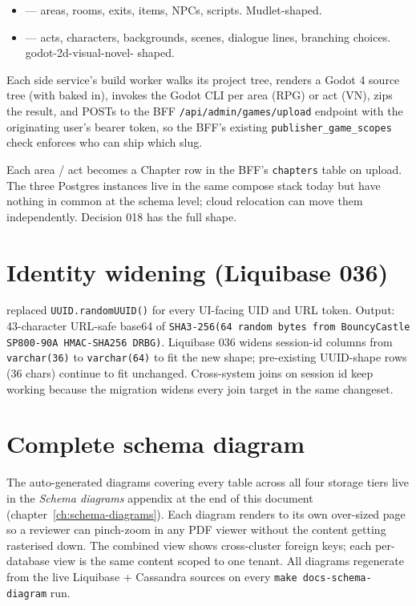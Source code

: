 \begin{itemize}
  \item {} --- areas, rooms, exits, items,
        NPCs, scripts. Mudlet-shaped.
  \item {} --- acts, characters, backgrounds,
        scenes, dialogue lines, branching choices. godot-2d-visual-novel-
        shaped.
\end{itemize}

Each side service's build worker walks its project tree, renders a
Godot 4 source tree (with 
baked in), invokes the Godot CLI per area (RPG) or act (VN), zips the
result, and POSTs to the BFF \texttt{/api/admin/games/upload}
endpoint with the originating user's bearer token, so the BFF's
existing \texttt{publisher\_game\_scopes} check enforces who can ship
which slug.

Each area / act becomes a Chapter row in the BFF's \texttt{chapters}
table on upload. The three Postgres instances live in the same compose
stack today but have nothing in common at the schema level; cloud
relocation can move them independently. Decision 018 has the full
shape.

\section{Identity widening (Liquibase 036)}

 replaced \texttt{UUID.randomUUID()} for
every UI-facing UID and URL token. Output: 43-character URL-safe base64
of \texttt{SHA3-256(64 random bytes from BouncyCastle SP800-90A
HMAC-SHA256 DRBG)}. Liquibase 036 widens session-id columns from
\texttt{varchar(36)} to \texttt{varchar(64)} to fit the new shape;
pre-existing UUID-shape rows (36 chars) continue to fit unchanged.
Cross-system joins on session id keep working because the migration
widens every join target in the same changeset.

\section{Complete schema diagram}

The auto-generated diagrams covering every table across all four
storage tiers live in the \emph{Schema diagrams} appendix at the end
of this document (chapter~\ref{ch:schema-diagrams}). Each diagram
renders to its own over-sized page so a reviewer can pinch-zoom in any
PDF viewer without the content getting rasterised down. The combined
view shows cross-cluster foreign keys; each per-database view is the
same content scoped to one tenant. All diagrams regenerate from the
live Liquibase + Cassandra sources on every
\texttt{make docs-schema-diagram} run.
